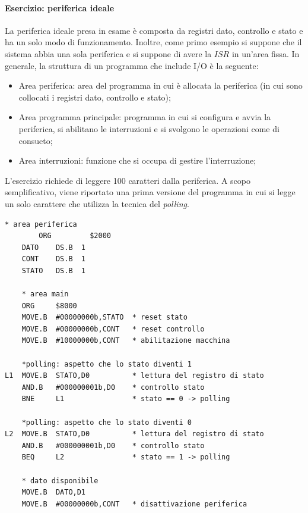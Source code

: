 \documentclass{article}
\begin{document}
\paragraph{Esercizio: periferica ideale}
La periferica ideale presa in esame è composta da registri dato, controllo e 
stato e ha un solo modo di funzionamento. Inoltre, come primo esempio si 
suppone che il sistema abbia una sola periferica e si suppone di avere 
la $ISR$ in un'area fissa.
In generale, la struttura di un programma che include I/O è la seguente:
\begin{itemize}
  \item Area periferica: area del programma in cui è allocata la periferica
    (in cui sono collocati i registri dato, controllo e stato);
  \item Area programma principale: programma in cui si configura e avvia 
    la periferica, si abilitano le interruzioni e si svolgono le operazioni 
    come di consueto;
  \item Area interruzioni: funzione che si occupa di gestire l'interruzione;
\end{itemize}

L'esercizio richiede di leggere 100 caratteri dalla periferica. A scopo 
semplificativo, viene riportato una prima versione del programma in 
cui si legge un solo carattere che utilizza la tecnica del \textit{polling}.

\begin{lstlisting}[language={[Motorola68k]Assembler},caption="Lettura 
  1 carattere in polling"]
    * area periferica
		ORG 		$2000 
    DATO    DS.B  1  
    CONT    DS.B  1
    STATO   DS.B  1

    * area main
    ORG     $8000
    MOVE.B  #00000000b,STATO  * reset stato
    MOVE.B  #00000000b,CONT   * reset controllo 
    MOVE.B  #10000000b,CONT   * abilitazione macchina

    *polling: aspetto che lo stato diventi 1
L1  MOVE.B  STATO,D0          * lettura del registro di stato 
    AND.B   #000000001b,D0    * controllo stato
    BNE     L1                * stato == 0 -> polling

    *polling: aspetto che lo stato diventi 0 
L2  MOVE.B  STATO,D0          * lettura del registro di stato
    AND.B   #000000001b,D0    * controllo stato 
    BEQ     L2                * stato == 1 -> polling

    * dato disponibile
    MOVE.B  DATO,D1
    MOVE.B  #00000000b,CONT   * disattivazione periferica
\end{lstlisting}
\end{document}
